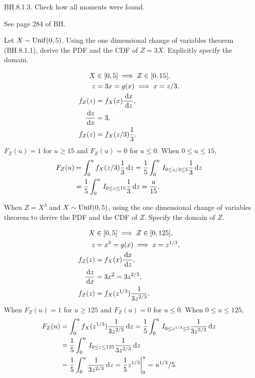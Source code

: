 \begin{exercise}
BH.8.1.3. Check how all moments were found.
\begin{solution}
See page 284 of BH.
\end{solution}
\end{exercise}

\begin{exercise}
Let $X \sim \mathrm{Unif}(0, 5)$. Using the one dimensional change of variables theorem (BH.8.1.1),  derive the PDF and the CDF of $Z=3X$. Explicitly specify the domain.
\begin{solution}
  \begin{align}
X &\in [0, 5]  \implies Z \in [0, 15],\\
z &= 3x = g(x) \implies x = z/3, \\
f_{Z}(z) &= f_{X}(x) \frac{\,\textrm{d}x}{\,\textrm{d}z},\\
\frac{\,\textrm{d}z}{\,\textrm{d}x} &= 3,\\
f_{Z}(z) &= f_{X}(z/3) \frac{1}{3}.
  \end{align}
$F_{Z}(u) = 1$ for $u\geq 15$ and $F_{Z}(u) = 0$ for $u\leq 0$. When $0\leq u \leq 15$,
  \begin{align}
  F_{Z}(u) &= \int_{0}^{u} f_{X}(z/3) \frac{1}{3} \,\textrm{d}z = \frac{1}{5}\int_{0}^{u} \,I_{0\leq  z/3\leq 5}  \frac{1}{3} \,\textrm{d}z \\
&= \frac{1}{5}\int_{0}^{u} \,I_{0\leq z\leq 15}  \frac{1}{3} \,\textrm{d}z = \frac{u}{15}.
  \end{align}
\end{solution}
\end{exercise}


\begin{exercise}
When $Z=X^3$ and $X\sim \mathrm{Unif}(0,5)$, using the one dimensional change of variables theorem to  derive the PDF and the CDF of $Z$. Specify the domain of $Z$.
\begin{solution}
\begin{align}
X &\in [0, 5]  \implies Z \in [0, 125],\\
z &= x^{3} = g(x) \implies x = z^{1/3}, \\
f_{Z}(z) &= f_{X}(x) \frac{\,\textrm{d}x}{\,\textrm{d}z},\\
\frac{\,\textrm{d}z}{\,\textrm{d}x} &= 3 x^{2} = 3 z^{2/3},\\
f_{Z}(z) &= f_{X}(z^{1/3}) \frac{1}{3z^{2/3}}.
 \end{align}
When $F_{Z}(u) = 1$ for $u\geq 125$ and $F_{Z}(u) = 0$ for $u\leq 0$. When $0\leq u \leq 125$,
 \begin{align}
 F_{Z}(u) &= \int_{0}^{u} f_{X}(z^{1/3}) \frac{1}{3z^{2/3}} \,\textrm{d}z = \frac{1}{5}\int_{0}^{u} \,I_{0\leq  z^{1/3}\leq 5}  \frac{1}{3z^{2/3}} \,\textrm{d}z \\
&= \frac{1}{5}\int_{0}^{u} \,I_{0\leq z\leq 125}  \frac{1}{3z^{2/3}} \,\textrm{d}z \\
&= \frac{1}{5}\int_{0}^{u}  \frac{1}{3z^{2/3}} \,\textrm{d}z =  \frac{1}{5}z^{1/3}\biggr|_{0}^{u} = u^{1/3}/5.
 \end{align}
\end{solution}
\end{exercise}



